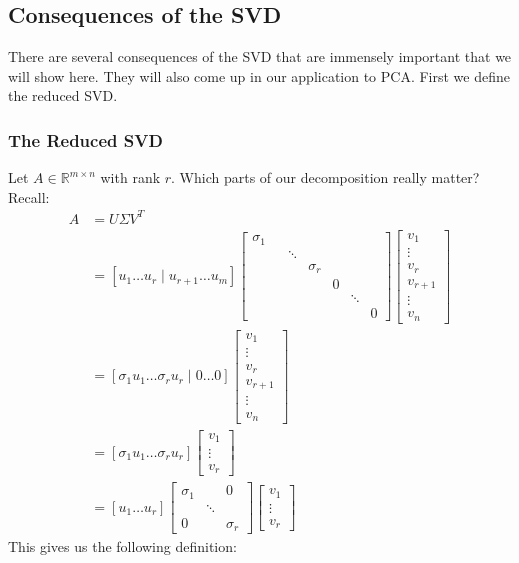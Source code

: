 \documentclass{article}
\begin{document}
\subsection{Consequences of the SVD}
There are several consequences of the SVD that are immensely important that we will show here. They will also come up in our application to PCA. First we define the reduced SVD.

\subsubsection{The Reduced SVD}
Let $A\in \mathbb{R}^{m\times n}$ with rank $r$. Which parts of our decomposition really matter? Recall:
\begin{align*}
    A&=U\Sigma V^T\\
    &=[ u_1 \dots u_r \mid u_{r+1} \dots u_m]\begin{bmatrix}\sigma_1 \\&&\ddots\\&&&\sigma_r\\&&&&0\\&&&&&\ddots\\&&&&&&0\end{bmatrix}\begin{bmatrix}v_1\\\vdots \\ v_r \\\hline v_{r+1}\\\vdots \\ v_n\end{bmatrix} \\
    &=[ \sigma_1u_1 \dots \sigma_ru_r \mid 0 \dots 0]\begin{bmatrix}v_1\\\vdots \\ v_r \\\hline v_{r+1}\\\vdots \\ v_n\end{bmatrix}\\
    &=[ \sigma_1u_1 \dots \sigma_ru_r]\begin{bmatrix}v_1\\\vdots \\ v_r\end{bmatrix}\\
    &= [ u_1 \dots u_r]\begin{bmatrix}\sigma_1&&0 \\&\ddots\\0&&\sigma_r\end{bmatrix}\begin{bmatrix}v_1\\\vdots \\ v_r\end{bmatrix}
\end{align*}
This gives us the following definition:
\bigskip
\end{document}
